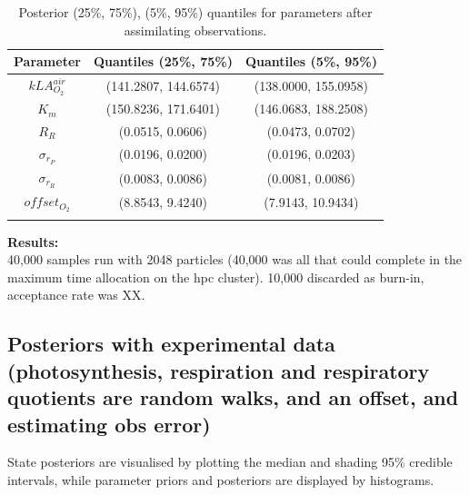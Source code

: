 \documentclass{ruthesis}
\begin{document}
\begin{longtable}{|c|c|c|} 
	\hline
	\bfseries{Parameter}  & \bfseries{Quantiles (25\%, 75\%)}  & \bfseries{Quantiles (5\%, 95\%)} \\ \hline
	$kLA_{O_2}^{air}$ 	& (141.2807, 144.6574)  & (138.0000, 155.0958)   \\
	$K_m$ 				& (150.8236, 171.6401) 	& (146.0683, 188.2508) 	 \\ 
	$R_R$ 				& (0.0515, 0.0606) 		& (0.0473, 0.0702) 		 \\
	$\sigma_{r_P}$ 		& (0.0196, 0.0200) 		& (0.0196, 0.0203) 		 \\ 
	$\sigma_{r_R}$ 		& (0.0083, 0.0086) 		& (0.0081, 0.0086)		 \\ 
	$offset_{O_2}$ 		& (8.8543, 9.4240) 		& (7.9143, 10.9434)		 \\ 	
	\hline
	\caption[.]{Posterior (25\%, 75\%), (5\%, 95\%) quantiles for parameters after assimilating observations.}	
	\label{table:micro_exp_offset_parameters_table}
\end{longtable}

\textbf{Results:}\\
40,000 samples run with 2048 particles (40,000 was all that could complete in the maximum time allocation on the hpc cluster). 10,000 discarded as burn-in, acceptance rate was XX.




\FloatBarrier
\subsection{Posteriors with experimental data (photosynthesis, respiration and respiratory quotients are random walks, and an offset, and estimating obs error)}


State posteriors are visualised by plotting the median and shading 95\% credible intervals, while parameter priors and posteriors are displayed by histograms.
\end{document}
